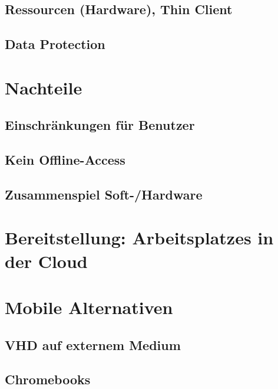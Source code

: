 \subsection{Ressourcen (Hardware), Thin Client}

\subsection{Data Protection}

\section{Nachteile}
	

\subsection{Einschränkungen für Benutzer}
\subsection{Kein Offline-Access}
\subsection{Zusammenspiel Soft-/Hardware}



\section{Bereitstellung: Arbeitsplatzes in der Cloud}



\section{Mobile Alternativen}

\subsection{VHD auf externem Medium}

\subsection{Chromebooks}
